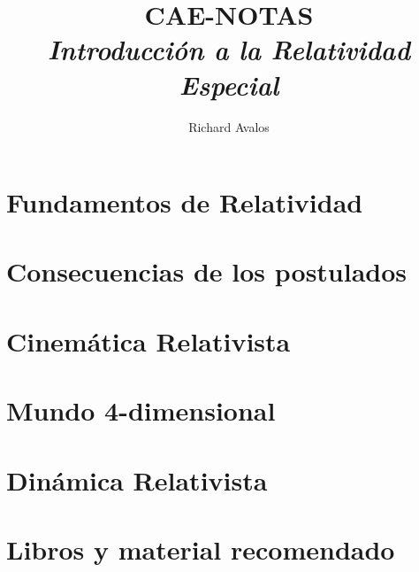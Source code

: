 \documentclass[12pt]{article}
\begin{document}
	\title{{CAE-NOTAS}\\{\normalsize{\itshape Introducción a la Relatividad Especial}}}
	\author{Richard Avalos}
	\maketitle
	\newpage
 
	\pagestyle{fancynotes}

        \part{Fundamentos de Relatividad}
        

        \clearpage

        \part{Consecuencias de los postulados}\label{Part:ConsecPostulados}
        

        \clearpage

        \part{Cinemática Relativista}\label{Part:CineRel}
        

        \clearpage

        \part{Mundo 4-dimensional}\label{Part:4-dim}
        

        \clearpage

        \part{Dinámica Relativista}\label{Part:Dinámica}
        
        
        \newpage

        \part*{Libros y material recomendado}
        
        
\end{document}
